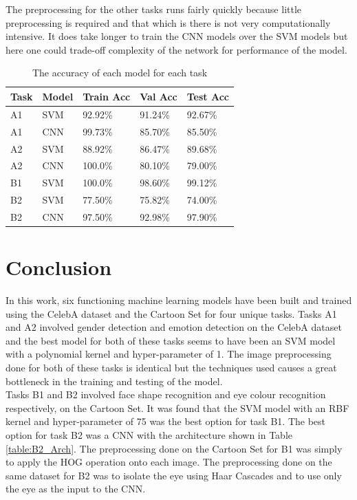 \documentclass{article}
\begin{document}
  	The preprocessing for the other tasks runs fairly quickly because little preprocessing is required and that which is there is not very computationally intensive. It does take longer to train the CNN models over the SVM models but here one could trade-off complexity of the network for performance of the model. 
    \begin{table}[]
    \begin{tabular}{@{}lllll@{}}
    \toprule
    Task & Model & Train Acc & Val Acc & Test Acc \\ \midrule
    A1   & SVM   & 92.92\%   & 91.24\% & 92.67\%         \\
    A1   & CNN   & 99.73\%   & 85.70\% & 85.50\%         \\
    A2   & SVM   & 88.92\%   & 86.47\% & 89.68\%         \\
    A2   & CNN   & 100.0\%   & 80.10\% & 79.00\%         \\
    B1   & SVM   & 100.0\%	 & 98.60\% & 99.12\%		 \\
    B2   & SVM	 & 77.50\%	 & 75.82\% & 74.00\%		 \\
    B2   & CNN	 & 97.50\%	 & 92.98\% & 97.90\%		 \\ \bottomrule
    \end{tabular}
	\caption{The accuracy of each model for each task}
	\label{table:results}
    \end{table}

\section{Conclusion}
\label{sec:conc}
    In this work, six functioning machine learning models have been built and trained using the CelebA dataset and the Cartoon Set for four unique tasks. Tasks A1 and A2 involved gender detection and emotion detection on the CelebA dataset and the best model for both of these tasks seems to have been an SVM model with a polynomial kernel and hyper-parameter of 1. The image preprocessing done for both of these tasks is identical but the techniques used causes a great bottleneck in the training and testing of the model.\\
    Tasks B1 and B2 involved face shape recognition and eye colour recognition respectively, on the Cartoon Set. It was found that the SVM model with an RBF kernel and hyper-parameter of 75 was the best option for task B1. The best option for task B2 was a CNN with the architecture shown in Table \ref{table:B2_Arch}. The preprocessing done on the Cartoon Set for B1 was simply to apply the HOG operation onto each image. The preprocessing done on the same dataset for B2 was to isolate the eye using Haar Cascades and to use only the eye as the input to the CNN.



\end{document}
